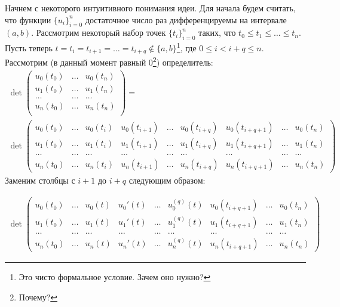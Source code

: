 Начнем с некоторого интуитивного понимания идеи. Для начала будем считать, что функции $\{u_i\}_{i=0}^n$ достаточное число раз
дифференцируемы на интервале $(a, b)$.
Рассмотрим некоторый набор точек $\{t_i\}_{i=0}^n$ таких, что $t_0 \leqslant t_1 \leqslant \ldots \leqslant t_n$.
Пусть теперь $t = t_i = t_{i+1} = \ldots = t_{i + q} \not \in \{a, b\}$\footnote{Это чисто формальное условие. Зачем оно нужно?},
где $0 \leqslant i < i + q \leqslant n$.
Рассмотрим (в данный момент равный $0$\footnote{Почему?}) определитель:
\begin{gather*}
    \det
    \begin{pmatrix}
        u_0(t_0) & … & u_0(t_n) \\
        u_1(t_0) & … & u_1(t_n) \\
        … & … & … \\
        u_n(t_0) & … & u_n(t_n) \\
    \end{pmatrix}=\\
    \det
    \begin{pmatrix}
        u_0(t_0) & … & u_0(t_i) & u_0(t_{i+1}) & \ldots & u_0(t_{i + q}) & u_0(t_{i + q + 1}) &\ldots & u_0(t_n) \\
        u_1(t_0) & … & u_1(t_i) & u_1(t_{i+1}) & \ldots & u_1(t_{i + q}) & u_1(t_{i + q + 1}) &\ldots & u_1(t_n) \\
        … & … & … & \ldots & \ldots & \ldots & \ldots & \ldots & \ldots\\
        u_n(t_0) & … & u_n(t_i) & u_n(t_{i+1}) & \ldots & u_n(t_{i + q}) & u_n(t_{i + q + 1}) &\ldots & u_n(t_n)
    \end{pmatrix}
\end{gather*}
Заменим столбцы с $i + 1$ до $i + q$ следующим образом:

\begin{gather*}
    \det
    \begin{pmatrix}
        u_0(t_0) & … & u_0(t) & u_0'(t) & \ldots & u_0^{(q)}(t) & u_0(t_{i + q + 1})& \ldots & u_0(t_n) \\
        u_1(t_0) & … & u_1(t) & u_1'(t) & \ldots & u_1^{(q)}(t) & u_1(t_{i + q + 1})& \ldots & u_1(t_n) \\
        … & … & … & \ldots & \ldots & \ldots & \ldots & \ldots & \ldots  \\
        u_n(t_0) & … & u_n(t) & u_n'(t) & \ldots & u_n^{(q)}(t) & u_n(t_{i + q + 1})& \ldots & u_n(t_n)
    \end{pmatrix}
\end{gather*}

